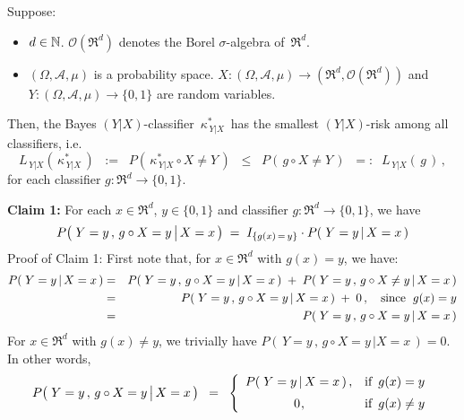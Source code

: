 \vskip 0.5cm
\begin{theorem}
\mbox{}\vskip 0.1cm
\noindent
Suppose:
\begin{itemize}
\item
	$d \in \mathbb{N}$.
	$\mathcal{O}(\Re^{d})$ denotes the Borel $\sigma$-algebra of \,$\Re^{d}$.
\item
	$(\Omega,\mathcal{A},\mu)$ is a probability space.
	$X : (\Omega,\mathcal{A},\mu) \longrightarrow (\Re^{d},\mathcal{O}(\Re^{d}))$ and\,
	$Y : (\Omega,\mathcal{A},\mu) \longrightarrow \{0,1\}$
	are random variables.
\end{itemize}
Then, the Bayes $(Y \vert X)$-classifier \,$\kappa^{*}_{\,Y \vert X}$\, has the smallest
$(Y \vert X)$-risk among all classifiers, i.e.
\begin{equation*}
L_{\,Y \vert X}(\,\kappa^{*}_{\,Y \vert X}\,)
\;\; := \;\;
	P\!\left(\, \kappa^{*}_{\,Y \vert X} \circ X \neq Y \,\right)
\;\;\leq\;\;
	P\!\left(\, g \circ X \neq Y \,\right)
\;\; =: \;\;
	L_{\,Y \vert X}(\, g \,)\,,
\end{equation*}
for each classifier $g : \Re^{d} \longrightarrow \{0,1\}$.
\end{theorem}
\proof
\vskip 0.2cm
\noindent
\textbf{Claim 1:}\quad
For each $x \in \Re^{d}$, $y \in \{0,1\}$ and classifier $g : \Re^{d} \longrightarrow \{0,1\}$,
we have
\begin{equation*}
P\!\left(\,\left. Y = y \,,\, \overset{{\color{white}.}}{g} \circ X = y \,\right\vert X = x \,\right)
\;=\;
I_{\{g(x)\,=\,y\}} \cdot P\!\left(\,\left. Y = y \,\right\vert X = x \,\right)
\end{equation*}
Proof of Claim 1:\;
First note that, for $x \in \Re^{d}$ with $g(x) = y$, we have:
\begin{eqnarray*}
P\!\left(\,\left. Y = y \,\right\vert X = x \,\right)
& = &
	P\!\left(\,\left. Y = y\,,\, g \circ X = y \,\right\vert X = x \,\right)
	\; + \;
	P\!\left(\,\left. Y = y\,,\, g \circ X \neq y \,\right\vert X = x \,\right)
\\
& = &
	P\!\left(\,\left. Y = y\,,\, g \circ X = y \,\right\vert X = x \,\right)
	\; + \;
	0\,,
	\quad
	\textnormal{since \;$g(x) = y$}
\\
& = &
	P\!\left(\,\left. Y = y\,,\, g \circ X = y \,\right\vert X = x \,\right)
\end{eqnarray*}
For $x \in \Re^{d}$ with $g(x) \neq y$, we trivially have
$P\!\left(\,\left. Y = y\,,\, g \circ X = y \,\right\vert X = x \,\right) = 0$.
In other words,
\begin{equation*}
P\!\left(\,\left. Y = y \,,\, \overset{{\color{white}.}}{g} \circ X = y \,\right\vert X = x \,\right)
\;\; = \;\;
	\left\{\begin{array}{cl}
	P\!\left(\,\left. Y = y \,\right\vert X = x \,\right), & \textnormal{if \,$g(x) = y$}
	\\
	\overset{{\color{white}-}}{0}, & \textnormal{if \,$g(x) \neq y$}
	\end{array}\right.
\end{equation*}
